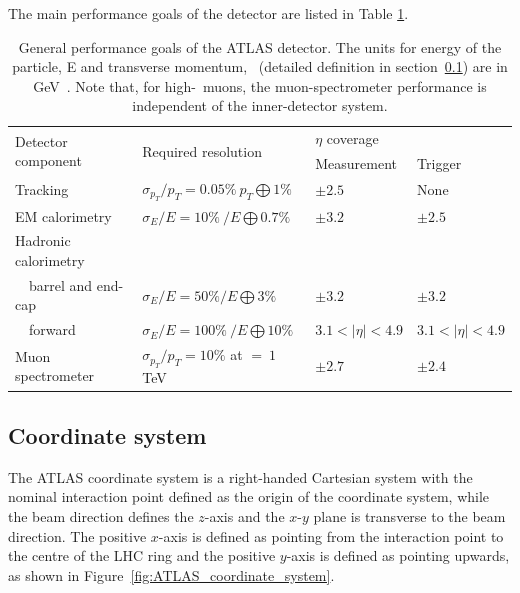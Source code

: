 The main performance goals of the detector are 
listed in Table \ref{tab:ATLAS_performance}. 
\begin{table}[thb]
	\centering
	\small
	\setlength\tabcolsep{5pt} 
	\begin{tabular}{|l|l|l|l| }
	\hline
	\multirow{2}{*}{Detector component}&\multirow{2}{*}{Required resolution} & \multicolumn{2}{l|}{$\eta$ coverage} \\ \cline{3-4}
	
	  & & Measurement &  Trigger\\ 
	 \hline
	Tracking         &    $\sigma_{p_T}/p_T = 0.05\%\ p_T\bigoplus 1\% $        &  $\pm 2.5$  & None \\  
	\hline
	EM calorimetry      &  $\sigma_E/E = 10\%\ /E\bigoplus 0.7\% $       & $\pm 3.2$ &  $\pm 2.5$\\
	\hline
	Hadronic calorimetry  &        & &      \\
	\ \ barrel and end-cap &  $\sigma_E/E = 50\%/E\bigoplus 3\% $       & $\pm 3.2$ &  $\pm 3.2$\\
	\ \ forward   &  $\sigma_E/E = 100\%\ /E\bigoplus 10\% $       & $ 3.1 < |\eta | < 4.9 $ &  $3.1 < |\eta | < 4.9 $\\
	\hline
	Muon spectrometer  &    $\sigma_{p_T}/p_T = 10\%$ at \pt $=\ 1$ TeV        &  $\pm 2.7$  & $\pm 2.4$ \\  
	\hline
	\end{tabular}
	\vspace{0.2cm}
	\caption{General performance goals of the ATLAS detector. The units for energy of the particle, E
	and transverse momentum, \pt\ (detailed definition in section~\ref{sec:detector coordinate}) 
	are in GeV~\cite{PERF-2007-01}. Note that, for high-\pt\ muons,
	the muon-spectrometer performance is independent of the inner-detector system.}
	\label{tab:ATLAS_performance}
\end{table}



\subsection{Coordinate system}
\label{sec:detector coordinate}

The ATLAS coordinate system is a right-handed Cartesian system
with the nominal interaction point 
defined as the origin of the coordinate system,  
while the beam direction defines the $z$-axis and 
the $x$-$y$ plane is transverse to the beam direction.  
The positive $x$-axis is defined as pointing from 
the interaction point to the centre of the
LHC ring and the positive $y$-axis is defined as 
pointing upwards, as shown in Figure~\ref{fig:ATLAS_coordinate_system}. 

